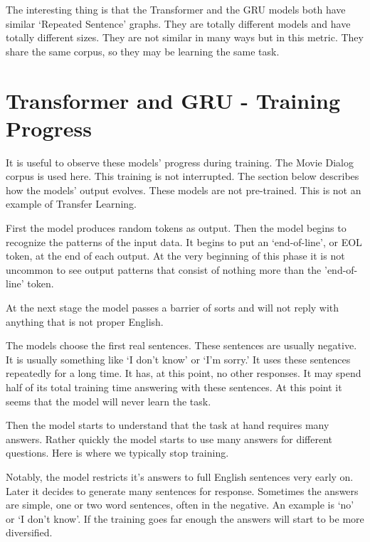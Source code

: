 The interesting thing is that the Transformer and the GRU models both have similar `Repeated Sentence' graphs. They are totally different models and have totally different sizes. They are not similar in many ways but in this metric. They share the same corpus, so they may be learning the same task.

\section{Transformer and GRU - Training Progress}

It is useful to observe these models' progress during training. The Movie Dialog corpus is used here. This training is not interrupted. The section below describes how the models' output evolves. These models are not pre-trained. This is not an example of Transfer Learning.

First the model produces random tokens as output. Then the model begins to recognize the patterns of the input data. It begins to put an `end-of-line', or \ac{EOL} token, at the end of each output. At the very beginning of this phase it is not uncommon to see output patterns that consist of nothing more than the 'end-of-line' token. 

At the next stage the model passes a barrier of sorts and will not reply with anything that is not proper English. 

The models choose the first real sentences. These sentences are usually negative. It is usually something like `I don't know' or `I'm sorry.' It uses these sentences repeatedly for a long time. It has, at this point, no other responses. It may spend half of its total training time answering with these sentences. At this point it seems that the model will never learn the task.


Then the model starts to understand that the task at hand requires many answers. Rather quickly the model starts to use many answers for different questions. Here is where we typically stop training.

Notably, the model restricts it's answers to full English sentences very early on. Later it decides to generate many sentences for response. Sometimes the answers are simple, one or two word sentences, often in the negative. An example is `no' or `I don't know'. If the training goes far enough the answers will start to be more diversified. 


